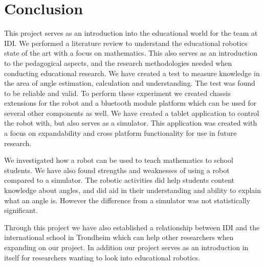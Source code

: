 \section{Conclusion}
This project serves as an introduction into the educational world for the \chirp team at IDI.
We performed a literature review to understand the educational robotics state of the art with a focus on mathematics. 
This also serves as an introduction to the pedagogical aspects, and the research methodologies needed when conducting educational research.
We have created a test to measure knowledge in the area of angle estimation, calculation and understanding. The test was found to be reliable and valid.
To perform these experiment we created chassis extensions for the robot and a bluetooth module platform which can be used for several other components as well.
We have created a tablet application to control the robot with, but also serves as a simulator. This application was created with a focus on expandability and cross platform functionality for use in future research.

\bigskip\noindent
We investigated how a robot can be used to teach mathematics to school students. We have also found strengths and weaknesses of using a robot compared to a simulator. 
The robotic activities did help students content knowledge about angles, and did aid in their understanding and ability to explain what an angle is. However the difference from a simulator was not statistically significant.

\bigskip\noindent
Through this project we have also established a relationship between IDI and the international school in Trondheim which can help other researchers when expanding on our project. In addition our project serves as an introduction in itself for researchers wanting to look into educational robotics. 

